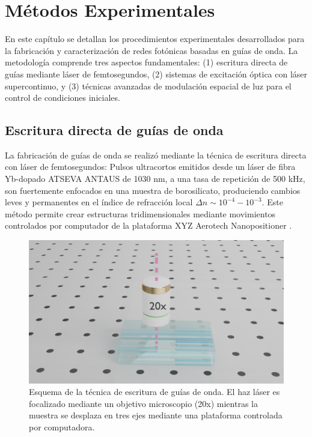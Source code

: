 \chapter{Métodos Experimentales \label{cap:exp}}

En este capítulo se detallan los procedimientos experimentales desarrollados para la fabricación y caracterización de redes fotónicas basadas en guías de onda. La metodología comprende tres aspectos fundamentales: (1) escritura directa de guías mediante láser de femtosegundos, (2) sistemas de excitación óptica con láser supercontinuo, y (3) técnicas avanzadas de modulación espacial de luz para el control de condiciones iniciales.


\section{Escritura directa de guías de onda \label{cap:fs}}

La fabricación de guías de onda se realizó mediante la técnica de escritura directa con láser de femtosegundos: Pulsos ultracortos emitidos desde un láser de fibra Yb-dopado ATSEVA ANTAUS de 1030 nm, a una tasa de repetición de 500 kHz, son fuertemente enfocados en una muestra de borosilicato, produciendo cambios leves y permanentes en el índice de refracción local $\Delta n \sim 10^{-4}-10^{-3}$. Este método permite crear estructuras tridimensionales mediante movimientos controlados por computador de la plataforma XYZ Aerotech Nanopositioner \citep{femto_writing}.

\begin{figure}[H]
    \centering
    \includegraphics[width=0.6\linewidth, trim={18cm 4cm 15cm 6cm},clip]{media/fabrication1}
    \caption[Esquema de la técnica de escritura de guías de onda.]{Esquema de la técnica de escritura de guías de onda. El haz láser es focalizado mediante un objetivo microscopio (20x) mientras la muestra se desplaza en tres ejes mediante una plataforma controlada por computadora.}
\end{figure}

